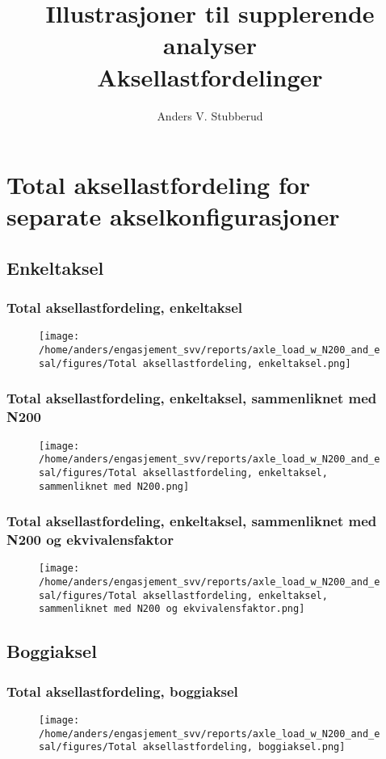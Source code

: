 \documentclass{article}
\begin{document}
\title{Illustrasjoner til supplerende analyser\\Aksellastfordelinger}
\author{Anders V. Stubberud}
\maketitle
\tableofcontents
\newpage
\section{Total aksellastfordeling for separate akselkonfigurasjoner}
\subsection{Enkeltaksel}
\subsubsection{Total aksellastfordeling, enkeltaksel}
\begin{figure}[H]
\centering
\texttt{[image: /home/anders/engasjement\_svv/reports/axle\_load\_w\_N200\_and\_esal/figures/Total aksellastfordeling, enkeltaksel.png]}
\end{figure}
\subsubsection{Total aksellastfordeling, enkeltaksel, sammenliknet med N200}
\begin{figure}[H]
\centering
\texttt{[image: /home/anders/engasjement\_svv/reports/axle\_load\_w\_N200\_and\_esal/figures/Total aksellastfordeling, enkeltaksel, sammenliknet med N200.png]}
\end{figure}
\subsubsection{Total aksellastfordeling, enkeltaksel, sammenliknet med N200 og ekvivalensfaktor}
\begin{figure}[H]
\centering
\texttt{[image: /home/anders/engasjement\_svv/reports/axle\_load\_w\_N200\_and\_esal/figures/Total aksellastfordeling, enkeltaksel, sammenliknet med N200 og ekvivalensfaktor.png]}
\end{figure}
\subsection{Boggiaksel}
\subsubsection{Total aksellastfordeling, boggiaksel}
\begin{figure}[H]
\centering
\texttt{[image: /home/anders/engasjement\_svv/reports/axle\_load\_w\_N200\_and\_esal/figures/Total aksellastfordeling, boggiaksel.png]}
\end{figure}
\end{document}
